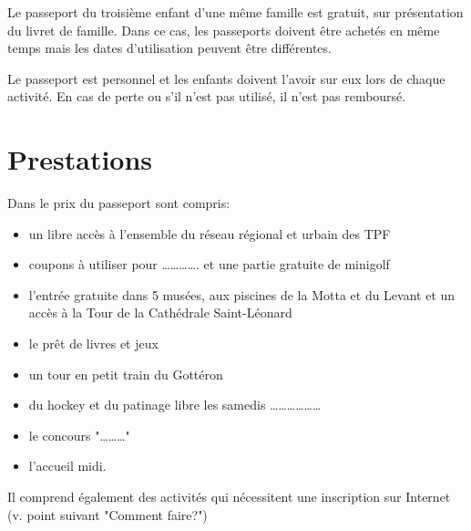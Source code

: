 Le passeport du troisième enfant d'une même famille est gratuit, sur
présentation du livret de famille. Dans ce cas, les passeports doivent être
achetés en même temps mais les dates d'utilisation peuvent être différentes.

Le passeport est personnel et les enfants doivent l'avoir sur eux lors de chaque
activité. En cas de perte ou s'il n'est pas utilisé, il n'est pas remboursé.

\section*{Prestations}

Dans le prix du passeport sont compris:

\begin{itemize}
\item un libre accès à l'ensemble du réseau régional et urbain des TPF
\item coupons à utiliser pour …………. et une partie gratuite de minigolf
\item l'entrée gratuite dans 5 musées, aux piscines de la Motta et du Levant et
un accès à la Tour de la Cathédrale Saint-Léonard
\item le prêt de livres et jeux
\item un tour en petit train du Gottéron
\item du hockey et du patinage libre les samedis ………………
\item le concours "………"
\item l'accueil midi.
\end{itemize}

Il comprend également des activités qui nécessitent une inscription sur Internet
(v. point suivant "Comment faire?")

